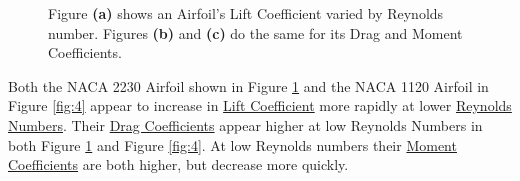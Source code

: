 \documentclass{article}
\begin{document}
\begin{figure}[!htb]
  \centering
  \caption{Figure \textbf{(a)} shows an Airfoil's Lift Coefficient varied by Reynolds number. Figures \textbf{(b)} and \textbf{(c)} do the same for its Drag and Moment Coefficients.}
  \label{fig:3}
\end{figure}

Both the NACA 2230 Airfoil shown in Figure \ref{fig:3} and the NACA 1120 Airfoil in Figure \ref{fig:4} appear to increase in \hyperlink{CL}{Lift Coefficient} more rapidly at lower \hyperlink{Re}{Reynolds Numbers}. Their \hyperlink{CD}{Drag Coefficients} appear higher at low Reynolds Numbers in both Figure \ref{fig:3} and Figure \ref{fig:4}. At low Reynolds numbers their \hyperlink{CM}{Moment Coefficients} are both higher, but decrease more quickly.
\end{document}
